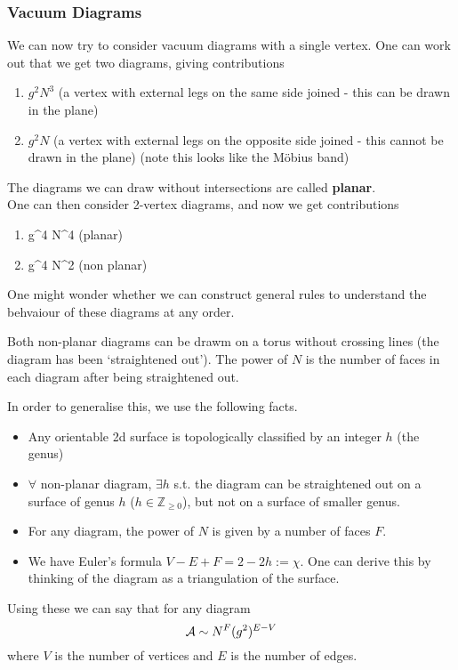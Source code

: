 \documentclass{article}
\begin{document}
\subsubsection{Vacuum Diagrams}
We can now try to consider vacuum diagrams with a single vertex. One can work out that we get two diagrams, giving contributions 
\begin{enumerate}
	\item $g^2 N^3$ (a vertex with external legs on the same side joined - this can be drawn in the plane)
	\item $g^2 N$ (a vertex with external legs on the opposite side joined - this cannot be drawn in the plane) (note this looks like the M\"obius band)
\end{enumerate}
The diagrams we can draw without intersections are called \textbf{planar}. \\
One can then consider 2-vertex diagrams, and now we get contributions 
\begin{enumerate}
	\item g^4 N^4 (planar)
	\item g^4 N^2 (non planar)
\end{enumerate} 
One might wonder whether we can construct general rules to understand the behvaiour of these diagrams at any order. 
\begin{remark}
	Both non-planar diagrams can be drawm on a torus without crossing lines (the diagram has been `straightened out'). The power of $N$ is the number of faces in each diagram after being straightened out. 
\end{remark}
In order to generalise this, we use the following facts.
\begin{itemize}
	\item Any orientable 2d surface is topologically classified by an integer $h$ (the genus) 
	\item $\forall$ non-planar diagram, $\exists h$ s.t. the diagram can be straightened out on a surface of genus $h$ ($h \in \mathbb{Z}_{\geq 0}$), but not on a surface of smaller genus. 
	\item For any diagram, the power of $N$ is given by a number of faces $F$.  
	\item We have Euler's formula $V-E+F = 2-2h := \chi$. One can derive this by thinking of the diagram as a triangulation of the surface. 
\end{itemize}
Using these we can say that for any diagram 
\[
\mathcal{A} \sim N^F (g^2)^{E-V}
\]
where $V$ is the number of vertices and $E$ is the number of edges. 
\end{document}
